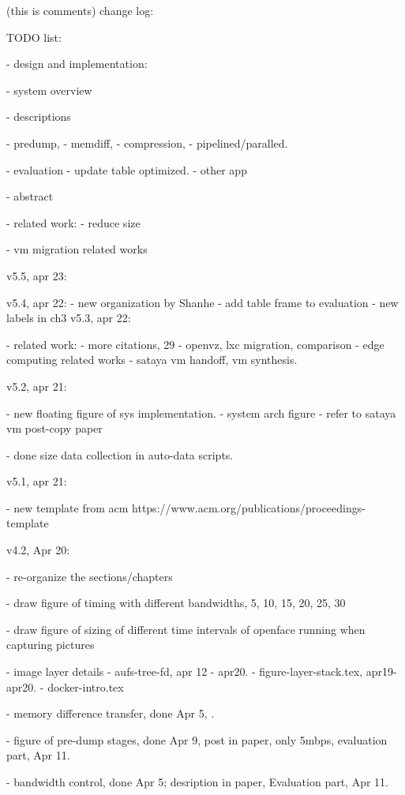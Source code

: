 
\iffalse
(this is comments) change log:

TODO list:

 - design and implementation:
 
    - system overview
 
    - descriptions

        - predump, 
        - memdiff, 
        - compression, 
        - pipelined/paralled.
    
 - evaluation
     - update table optimized.
     - other app

    
 - abstract
 
 - related work:
    - reduce size
    
    - vm migration related works

v5.5, apr 23:

v5.4, apr 22:
    - new organization by Shanhe
    - add table frame to evaluation
    - new labels in ch3
v5.3, apr 22:

 - related work:
    - more citations, 29
    - openvz, lxc migration, comparison
    - edge computing related works
    - sataya vm handoff, vm synthesis. 
    


v5.2, apr 21:

 - new floating figure of sys implementation.
    - system arch figure
    - refer to sataya vm post-copy paper
    
 - done size data collection in auto-data scripts.

v5.1, apr 21:

 - new template from acm
    https://www.acm.org/publications/proceedings-template
 
v4.2, Apr 20: 

 - re-organize the sections/chapters
 
 - draw figure of timing with different bandwidths, 5, 10, 15, 20, 25, 30
 
 - draw figure of sizing of different time intervals of openface running when capturing pictures
 
 - image layer details
    - aufs-tree-fd, apr 12 - apr20.
    - figure-layer-stack.tex, apr19-apr20.
    - docker-intro.tex
 
 - memory difference transfer, done Apr 5, .
 
 - figure of pre-dump stages, done Apr 9, post in paper, only 5mbps, evaluation part, Apr 11.
 
 - bandwidth control, done Apr 5; desription in paper, Evaluation part, Apr 11.

